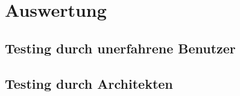\section{Auswertung}
\subsection{Testing durch unerfahrene Benutzer}
\subsection{Testing durch Architekten}
